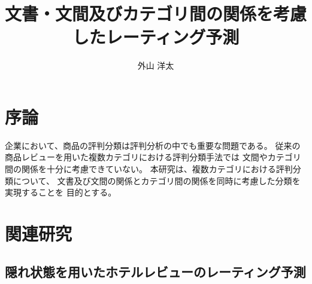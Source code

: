 \documentclass{ttisummary}
\title{文書・文間及びカテゴリ間の関係を考慮したレーティング予測}
\author{外山 洋太}
\begin{document}
\section{序論}




企業において、商品の評判分類は評判分析の中でも重要な問題である。
従来の商品レビューを用いた複数カテゴリにおける評判分類手法では
文間やカテゴリ間の関係を十分に考慮できていない。
本研究は、複数カテゴリにおける評判分類について、
文書及び文間の関係とカテゴリ間の関係を同時に考慮した分類を実現することを
目的とする。



\section{関連研究}

\subsection{隠れ状態を用いたホテルレビューのレーティング予測}
\end{document}
